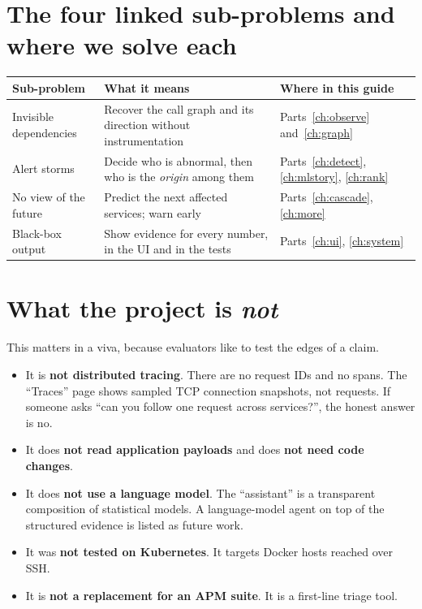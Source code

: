 \section{The four linked sub-problems and where we solve each}
\begin{center}
\small
\begin{tabularx}{\textwidth}{>{\raggedright\arraybackslash}p{3.3cm}>{\raggedright\arraybackslash}X>{\raggedright\arraybackslash}p{4cm}}
\toprule
\textbf{Sub-problem} & \textbf{What it means} & \textbf{Where in this guide}\\
\midrule
Invisible dependencies & Recover the call graph and its direction without instrumentation & Parts~\ref{ch:observe} and~\ref{ch:graph}\\
Alert storms & Decide who is abnormal, then who is the \emph{origin} among them & Parts~\ref{ch:detect}, \ref{ch:mlstory}, \ref{ch:rank}\\
No view of the future & Predict the next affected services; warn early & Parts~\ref{ch:cascade}, \ref{ch:more}\\
Black-box output & Show evidence for every number, in the UI and in the tests & Parts~\ref{ch:ui}, \ref{ch:system}\\
\bottomrule
\end{tabularx}
\end{center}

\section{What the project is \emph{not}}
This matters in a viva, because evaluators like to test the edges of a claim.

\begin{itemize}
\item It is \textbf{not distributed tracing}. There are no request IDs and no spans. The ``Traces'' page shows sampled TCP connection snapshots, not requests. If someone asks ``can you follow one request across services?'', the honest answer is no.
\item It does \textbf{not read application payloads} and does \textbf{not need code changes}.
\item It does \textbf{not use a language model}. The ``assistant'' is a transparent composition of statistical models. A language-model agent on top of the structured evidence is listed as future work.
\item It was \textbf{not tested on Kubernetes}. It targets Docker hosts reached over SSH.
\item It is \textbf{not a replacement for an APM suite}. It is a first-line triage tool.
\end{itemize}

